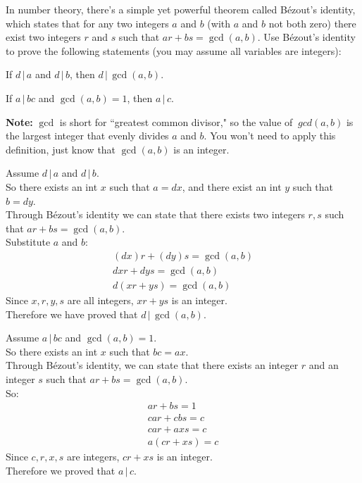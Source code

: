 \documentclass[12pt]{exam}
\newcommand{\divides}{\,|\,}
\begin{document}
In number theory, there's a simple yet powerful theorem called Bézout's identity,
which states that for any two integers $a$ and $b$ (with $a$ and $b$ not both zero)
there exist two integers $r$ and $s$ such that $ar+bs=\gcd(a,b).$ Use Bézout's
identity to prove the following statements (you may assume all variables are
integers):
\begin{qparts}
    \item If $d \divides a$ and $d\divides b$, then $d \divides \gcd(a,b)$.
    \item If $a \divides bc$ and $\gcd(a,b) = 1$, then $a \divides c$.
\end{qparts}

\noindent
\textbf{Note:} $\gcd$ is short for ``greatest common divisor," so the value of $\
gcd(a,b)$ is the largest integer that evenly divides $a$ and $b.$ You won't need to
apply this definition, just know that $\gcd(a,b)$ is an integer.
\begin{solution}

\begin{qparts}
\item
Assume $d \divides a$ and $d \divides b$.\\
So there exists an int $x$ such that $a=dx$, and there exist an int $y$ such that $b = dy$.\\
Through Bézout's identity we can state that there exists two integers $r,s$ such that $ar + bs = \gcd(a,b)$.\\
Substitute $a$ and $b$:\\
\begin{align*}
    (dx)r + (dy) s = \gcd(a,b) \\
    dxr + dys = \gcd(a,b)\\
    d(xr+ys) = \gcd(a,b)
\end{align*}
Since $x,r,y,s$ are all integers, $xr+ys$ is an integer.\\
Therefore we have proved that $d \divides \gcd(a,b)$.
\item
Assume $a \divides bc$ and $\gcd(a,b) = 1$.\\
So there exists an int $x$ such that $bc = ax$.\\
Through Bézout's identity, we can state that there exists an integer $r$ and an integer $s$ such that $ar+bs = \gcd(a,b)$.\\
So:
\begin{align*}
    ar+bs = 1 \\
    car + cbs = c \\
    car + axs = c \\
    a (cr + xs) = c
\end{align*}
Since $c,r,x,s$ are integers, $cr+xs$ is an integer.\\
Therefore we proved that $a \divides c$.
\end{qparts}

\end{solution}
\end{document}

